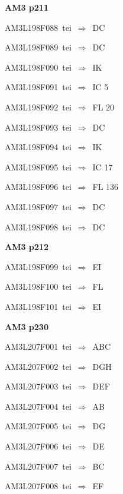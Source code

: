 \par\vfill\eject
{\bf\hfill AM3 p211\hfill\hbox{}}\par\bigskip
{\sixrm AM3L198F088\ {\sixit tei}\ }$\Rightarrow$\ DC\par\smallskip
{\sixrm AM3L198F089\ {\sixit tei}\ }$\Rightarrow$\ DC\par\smallskip
{\sixrm AM3L198F090\ {\sixit tei}\ }$\Rightarrow$\ IK\par\smallskip
{\sixrm AM3L198F091\ {\sixit tei}\ }$\Rightarrow$\ IC 5\par\smallskip
{\sixrm AM3L198F092\ {\sixit tei}\ }$\Rightarrow$\ FL 20\par\smallskip
{\sixrm AM3L198F093\ {\sixit tei}\ }$\Rightarrow$\ DC\par\smallskip
{\sixrm AM3L198F094\ {\sixit tei}\ }$\Rightarrow$\ IK\par\smallskip
{\sixrm AM3L198F095\ {\sixit tei}\ }$\Rightarrow$\ IC 17\par\smallskip
{\sixrm AM3L198F096\ {\sixit tei}\ }$\Rightarrow$\ FL 136\par\smallskip
{\sixrm AM3L198F097\ {\sixit tei}\ }$\Rightarrow$\ DC\par\smallskip
{\sixrm AM3L198F098\ {\sixit tei}\ }$\Rightarrow$\ DC\par\smallskip

\par\vfill\eject
{\bf\hfill AM3 p212\hfill\hbox{}}\par\bigskip
{\sixrm AM3L198F099\ {\sixit tei}\ }$\Rightarrow$\ EI\par\smallskip
{\sixrm AM3L198F100\ {\sixit tei}\ }$\Rightarrow$\ FL\par\smallskip
{\sixrm AM3L198F101\ {\sixit tei}\ }$\Rightarrow$\ EI\par\smallskip

\par\vfill\eject
{\bf\hfill AM3 p230\hfill\hbox{}}\par\bigskip
{\sixrm AM3L207F001\ {\sixit tei}\ }$\Rightarrow$\ ABC\par\smallskip
{\sixrm AM3L207F002\ {\sixit tei}\ }$\Rightarrow$\ DGH\par\smallskip
{\sixrm AM3L207F003\ {\sixit tei}\ }$\Rightarrow$\ DEF\par\smallskip
{\sixrm AM3L207F004\ {\sixit tei}\ }$\Rightarrow$\ AB\par\smallskip
{\sixrm AM3L207F005\ {\sixit tei}\ }$\Rightarrow$\ DG\par\smallskip
{\sixrm AM3L207F006\ {\sixit tei}\ }$\Rightarrow$\ DE\par\smallskip
{\sixrm AM3L207F007\ {\sixit tei}\ }$\Rightarrow$\ BC\par\smallskip
{\sixrm AM3L207F008\ {\sixit tei}\ }$\Rightarrow$\ EF\par\smallskip


